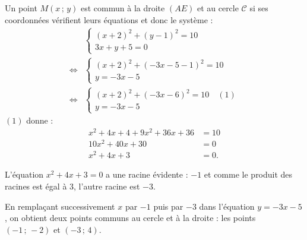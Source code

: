 Un point \(M(x\,;\,y)\) est commun à la droite \((AE)\) et au cercle \(\mathcal{C}\) si ses coordonnées vérifient leurs équations et donc le système :
\begin{align*}
&\begin{cases}
(x + 2)^2 + (y - 1)^2 = 10 \\
3x + y + 5 = 0
\end{cases} \\
\iff &\begin{cases}
(x + 2)^2 + (-3x - 5 - 1)^2 = 10 \\
y = -3x - 5
\end{cases} \\
\iff &\begin{cases}
(x + 2)^2 + (-3x - 6)^2 = 10 \quad (1)\\
y = -3x - 5
\end{cases}
\end{align*}
\((1)\) donne :
\begin{align*}
x^2 + 4x + 4 + 9x^2 + 36x + 36 &= 10 \\
10x^2 + 40x + 30 &= 0 \\
x^2 + 4x + 3 &= 0.
\end{align*}

L'équation \(x^2 + 4x + 3 = 0\) a une racine évidente : \(-1\) et comme le produit des racines est égal à 3, l'autre racine est \(-3\).

En remplaçant successivement \(x\) par \(-1\) puis par \(-3\) dans l'équation \(y = -3x - 5\), on obtient deux points communs au cercle et à la droite : les points \((-1 \,;\, -2)\) et \((-3 \,;\, 4)\).
